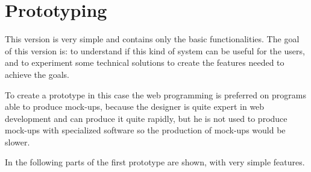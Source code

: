 \section{Prototyping}

This version is very simple and contains only the basic functionalities. 
The goal of this version is: to understand if this kind of system can be useful for the users, and to experiment some technical solutions to create the features needed to achieve the goals. 

To create a prototype in this case the web programming is preferred on programs able to produce mock-ups, because the designer is quite expert in web development and can produce it quite rapidly, but he is not used to produce mock-ups with specialized software so the production of mock-ups would be slower. 


In the following parts of the first prototype are shown, with very simple features.

